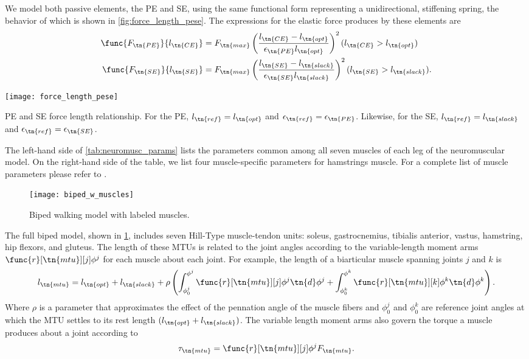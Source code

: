 We model both passive elements, the PE and SE, using the same functional form
representing a unidirectional, stiffening spring, the behavior of which is shown
in \cref{fig:force_length_pese}. The expressions for the elastic force produces
by these elements are
\begin{align}
    \func{F_\tn{PE}}{l_\tn{CE}} &= F_\tn{max} \left( \frac{l_\tn{CE} -
        l_\tn{opt}}{\epsilon_\tn{PE} l_\tn{opt}} \right)^2 
        (l_\tn{CE} > l_\tn{opt}) \label{eq:parallel_force_length}\\
    \func{F_\tn{SE}}{l_\tn{SE}} &= F_\tn{max} \left( \frac{l_\tn{SE} - 
        l_\tn{slack}}{\epsilon_\tn{SE} l_\tn{slack}} \right)^2 
        (l_\tn{SE} > l_\tn{slack}). \label{eq:series_force_length}
\end{align}
\begin{marginfigure}
    \centering
    \texttt{[image: force\_length\_pese]}
    \caption{PE and SE force length relationship. For the PE, $l_\tn{ref} = l_\tn{opt}$
    and $\epsilon_\tn{ref} = \epsilon_\tn{PE}$. Likewise, for the SE, $l_\tn{ref} =
    l_\tn{slack}$ and $\epsilon_\tn{ref} = \epsilon_\tn{SE}$.} 
    \label{fig:force_length_pese}
\end{marginfigure}

The left-hand side of \cref{tab:neuromusc_params} lists the parameters common
among all seven muscles of each leg of the neuromuscular model. On the
right-hand side of the table, we list four muscle-specific parameters for
hamstrings muscle. For a complete list of muscle parameters please refer
to \citet{song2015neural}. 

\begin{figure}[b]
    \centering
    \texttt{[image: biped\_w\_muscles]}
    \caption{Biped walking model with labeled muscles.} 
    \label{fig:biped_w_muscles}
\end{figure} 
The full biped model, shown in \cref{fig:biped_w_muscles}, includes
seven Hill-Type muscle-tendon units: soleus, gastrocnemius, tibialis anterior,
vastus, hamstring, hip flexors, and gluteus. The length of these MTUs is related
to the joint angles according to the variable-length moment arms
$\func{r}[\tn{mtu}][j]{\phi^j}$ for each muscle about each joint. For example,
the length of a biarticular muscle spanning joints $j$ and $k$ is
\begin{align}
    l_\tn{mtu} = l_\tn{opt} + l_\tn{slack} + \rho \left( \int_{\phi_0^j}^{\phi^j}
        \func{r}[\tn{mtu}][j]{\phi^j} \tn{d} \phi^j + \int_{\phi_0^k}^{\phi^k}
        \func{r}[\tn{mtu}][k]{\phi^k} \tn{d} \phi^k \right).
\end{align}
Where $\rho$ is a parameter that approximates the effect of the pennation angle
of the muscle fibers and $\phi_0^j$ and $\phi_0^k$ are reference joint angles at
which the MTU settles to its rest length $(l_\tn{opt} + l_\tn{slack})$. The
variable length moment arms also govern the torque a muscle produces about a
joint according to
\begin{align}
    \tau_\tn{mtu} = \func{r}[\tn{mtu}][j]{\phi^j} F_\tn{mtu}.
    \label{eq:muscle_moment}
\end{align}
